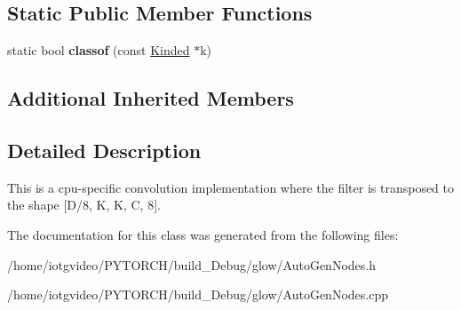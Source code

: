 \subsection*{Static Public Member Functions}
\begin{DoxyCompactItemize}
\item 
\mbox{\label{classglow_1_1_c_p_u_conv_d_k_k_c8_node_a7cba221408b56faa32d8f8b0868ff251}} 
static bool {\bfseries classof} (const \hyperlink{classglow_1_1_kinded}{Kinded} $\ast$k)
\end{DoxyCompactItemize}
\subsection*{Additional Inherited Members}


\subsection{Detailed Description}
This is a cpu-\/specific convolution implementation where the filter is transposed to the shape \mbox{[}D/8, K, K, C, 8\mbox{]}. 

The documentation for this class was generated from the following files\+:\begin{DoxyCompactItemize}
\item 
/home/iotgvideo/\+P\+Y\+T\+O\+R\+C\+H/build\+\_\+\+Debug/glow/Auto\+Gen\+Nodes.\+h\item 
/home/iotgvideo/\+P\+Y\+T\+O\+R\+C\+H/build\+\_\+\+Debug/glow/Auto\+Gen\+Nodes.\+cpp\end{DoxyCompactItemize}
